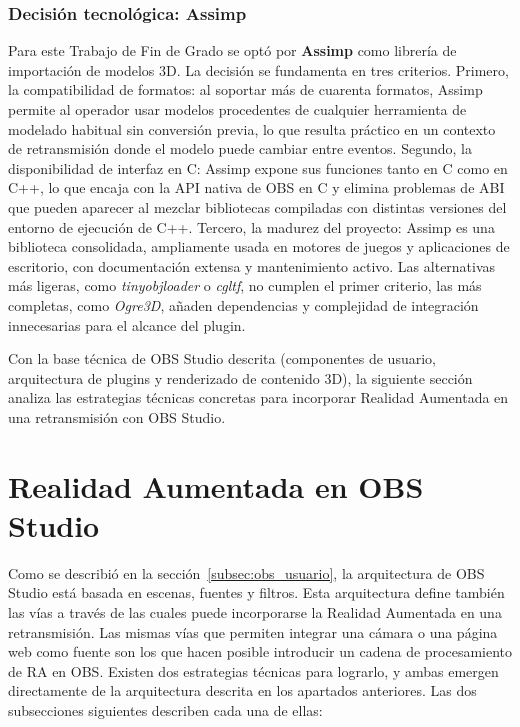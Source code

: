\subsubsection*{Decisión tecnológica: Assimp}

Para este Trabajo de Fin de Grado se optó por \textbf{Assimp} \citep{assimp_github} como librería de importación de modelos 3D. La decisión se fundamenta en tres criterios. Primero, la compatibilidad de formatos: al soportar más de cuarenta formatos, Assimp permite al operador usar modelos procedentes de cualquier herramienta de modelado habitual sin conversión previa, lo que resulta práctico en un contexto de retransmisión donde el modelo puede cambiar entre eventos. Segundo, la disponibilidad de interfaz en C: Assimp expone sus funciones tanto en C como en C++, lo que encaja con la API nativa de OBS en C y elimina problemas de ABI que pueden aparecer al mezclar bibliotecas compiladas con distintas versiones del entorno de ejecución de C++. Tercero, la madurez del proyecto: Assimp es una biblioteca consolidada, ampliamente usada en motores de juegos y aplicaciones de escritorio, con documentación extensa y mantenimiento activo. Las alternativas más ligeras, como \textit{tinyobjloader} o \textit{cgltf}, no cumplen el primer criterio, las más completas, como \textit{Ogre3D}, añaden dependencias y complejidad de integración innecesarias para el alcance del plugin.

Con la base técnica de OBS Studio descrita (componentes de usuario, arquitectura de plugins y renderizado de contenido 3D), la siguiente sección analiza las estrategias técnicas concretas para incorporar Realidad Aumentada en una retransmisión con OBS Studio.


\section{Realidad Aumentada en OBS Studio}
\label{sec:integracion_obs}

Como se describió en la sección~\ref{subsec:obs_usuario}, la arquitectura de OBS Studio está basada en escenas, fuentes y filtros. Esta arquitectura define también las vías a través de las cuales puede incorporarse la Realidad Aumentada en una retransmisión. Las mismas vías que permiten integrar una cámara o una página web como fuente son los que hacen posible introducir un cadena de procesamiento de RA en OBS. Existen dos estrategias técnicas para lograrlo, y ambas emergen directamente de la arquitectura descrita en los apartados anteriores. Las dos subsecciones siguientes describen cada una de ellas:

